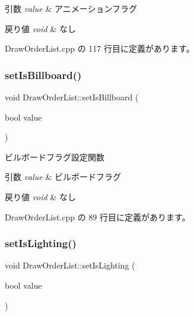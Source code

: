 \begin{DoxyParams}{引数}
{\em value} & アニメーションフラグ \\
\hline
\end{DoxyParams}

\begin{DoxyRetVals}{戻り値}
{\em void} & なし \\
\hline
\end{DoxyRetVals}


 Draw\+Order\+List.\+cpp の 117 行目に定義があります。

\mbox{\label{class_draw_order_list_a80a404e3308a92dcb9bfa3451518d14e}} 
\subsubsection{\texorpdfstring{set\+Is\+Billboard()}{setIsBillboard()}}
{\footnotesize\ttfamily void Draw\+Order\+List\+::set\+Is\+Billboard (\begin{DoxyParamCaption}\item[{bool}]{value }\end{DoxyParamCaption})}



ビルボードフラグ設定関数 


\begin{DoxyParams}{引数}
{\em value} & ビルボードフラグ \\
\hline
\end{DoxyParams}

\begin{DoxyRetVals}{戻り値}
{\em void} & なし \\
\hline
\end{DoxyRetVals}


 Draw\+Order\+List.\+cpp の 89 行目に定義があります。

\mbox{\label{class_draw_order_list_a90504fdecaa6c022c8b85919352a10b1}} 
\subsubsection{\texorpdfstring{set\+Is\+Lighting()}{setIsLighting()}}
{\footnotesize\ttfamily void Draw\+Order\+List\+::set\+Is\+Lighting (\begin{DoxyParamCaption}\item[{bool}]{value }\end{DoxyParamCaption})}



